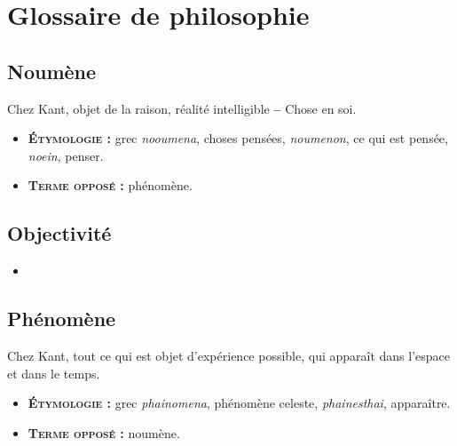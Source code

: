 
\chapter{Glossaire de philosophie}

\section{Noumène}
Chez {\sc Kant}, objet de la raison, réalité intelligible {\bf --} Chose en soi.
{\footnotesize
\begin{itemize}[leftmargin=1cm, label=, itemsep=1pt]
\item {\bf \textsc{Étymologie} :} grec {\it nooumena}, choses pensées, {\it noumenon}, ce qui est pensée, {\it noein}, penser.
\item {\bf \textsc{Terme opposé} :} phénomène.
\end{itemize}
}


\newpage
\section{Objectivité}
{\footnotesize
\begin{itemize}[leftmargin=1cm, label=, itemsep=1pt]
\item %
\end{itemize}
}


%

\newpage
\section{Phénomène}
Chez {\sc Kant}, tout ce qui est objet d'expérience possible, qui apparaît dans l'espace et dans le temps.

{\footnotesize
\begin{itemize}[leftmargin=1cm, label=, itemsep=1pt]
\item {\bf \textsc{Étymologie} :} grec {\it phainomena}, phénomène celeste, {\it phainesthai}, apparaître.
\item {\bf \textsc{Terme opposé} :} noumène.
\end{itemize}
}


